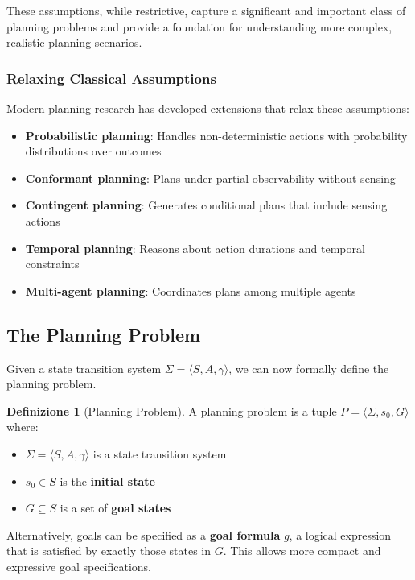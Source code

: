 \documentclass[11pt,a4paper]{article}
\theoremstyle{definition}
\newtheorem{definition}{Definizione}[section]
\theoremstyle{plain}
\theoremstyle{remark}
\begin{document}
These assumptions, while restrictive, capture a significant and important class of planning problems and provide a foundation for understanding more complex, realistic planning scenarios.

\subsubsection{Relaxing Classical Assumptions}

Modern planning research has developed extensions that relax these assumptions:

\begin{itemize}
    \item \textbf{Probabilistic planning}: Handles non-deterministic actions with probability distributions over outcomes
    \item \textbf{Conformant planning}: Plans under partial observability without sensing
    \item \textbf{Contingent planning}: Generates conditional plans that include sensing actions
    \item \textbf{Temporal planning}: Reasons about action durations and temporal constraints
    \item \textbf{Multi-agent planning}: Coordinates plans among multiple agents
\end{itemize}

\newpage

\subsection{The Planning Problem}

Given a state transition system $\Sigma = \langle S, A, \gamma \rangle$, we can now formally define the planning problem.

\begin{definition}[Planning Problem]
A planning problem is a tuple $P = \langle \Sigma, s_0, G \rangle$ where:
\begin{itemize}
    \item $\Sigma = \langle S, A, \gamma \rangle$ is a state transition system
    \item $s_0 \in S$ is the \textbf{initial state}
    \item $G \subseteq S$ is a set of \textbf{goal states}
\end{itemize}
\end{definition}

Alternatively, goals can be specified as a \textbf{goal formula} $g$, a logical expression that is satisfied by exactly those states in $G$. This allows more compact and expressive goal specifications.
\end{document}
